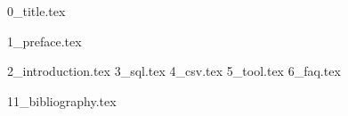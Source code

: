 \documentclass[11pt]{book}
\begin{document}
{0_title.tex}

\tableofcontents
\listoffigures
\listoftables
\lstlistoflistings

\renewcommand{\chaptermark}[1]{\markboth{\normalsize\sffamily\bfseries\ #1}{}} %
{1_preface.tex}

\renewcommand{\chaptermark}[1]{\markboth{\normalsize\sffamily\bfseries\chaptername\ \thechapter.\ #1}{}} %
\mainmatter

{2_introduction.tex}
{3_sql.tex}
{4_csv.tex}
{5_tool.tex}
{6_faq.tex}

\appendix

\backmatter
{11_bibliography.tex}
\end{document}
